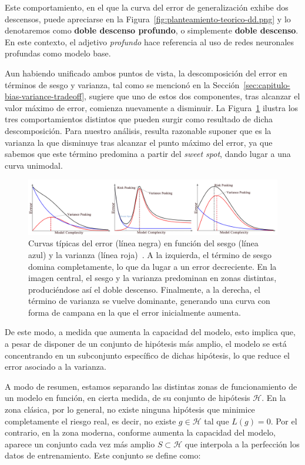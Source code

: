 Este comportamiento, en el que la curva del error de generalización exhibe dos descensos, puede apreciarse en la Figura~\ref{fig:planteamiento-teorico-dd.png} y lo denotaremos como \textbf{doble descenso profundo}, o simplemente \textbf{doble descenso}. En este contexto, el adjetivo \textit{profundo} hace referencia al uso de redes neuronales profundas como modelo base.

Aun habiendo unificado ambos puntos de vista, la descomposición del error en términos de sesgo y varianza, tal como se mencionó en la Sección~\ref{sec:capitulo-bias-variance-tradeoff}, sugiere que uno de estos dos componentes, tras alcanzar el valor máximo de error, comienza nuevamente a disminuir. La Figura~\ref{fig:bias-variance-peak} ilustra los tres comportamientos distintos que pueden surgir como resultado de dicha descomposición. Para nuestro análisis, resulta razonable suponer que es la varianza la que disminuye tras alcanzar el punto máximo del error, ya que sabemos que este término predomina a partir del \textit{sweet spot}, dando lugar a una curva unimodal.

\begin{figure}[h]
    \centering
    \includegraphics[width=0.9\linewidth]{img/bias-variance-peak.png}
    \caption[Curvas típicas del error en función del sesgo y la varianza~\cite{Yang2020}.]{Curvas típicas del error (línea negra) en función del sesgo (línea azul) y la varianza (línea roja)~\cite{Yang2020}. A la izquierda, el término de sesgo domina completamente, lo que da lugar a un error decreciente. En la imagen central, el sesgo y la varianza predominan en zonas distintas, produciéndose así el doble descenso. Finalmente, a la derecha, el término de varianza se vuelve dominante, generando una curva con forma de campana en la que el error inicialmente aumenta.}\label{fig:bias-variance-peak}
\end{figure}

De este modo, a medida que aumenta la capacidad del modelo, esto implica que, a pesar de disponer de un conjunto de hipótesis más amplio, el modelo se está concentrando en un subconjunto específico de dichas hipótesis, lo que reduce el error asociado a la varianza.

A modo de resumen, estamos separando las distintas zonas de funcionamiento de un modelo en función, en cierta medida, de su conjunto de hipótesis $\mathcal{H}$. En la zona clásica, por lo general, no existe ninguna hipótesis que minimice completamente el riesgo real, es decir, no existe $g \in \mathcal{H}$ tal que $L(g) = 0$. Por el contrario, en la zona moderna, conforme aumenta la capacidad del modelo, aparece un conjunto cada vez más amplio $S \subset \mathcal{H}$ que interpola a la perfección los datos de entrenamiento. Este conjunto se define como:  

